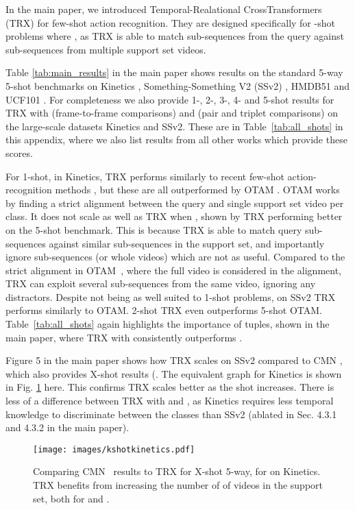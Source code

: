 \documentclass[final]{cvpr}
\begin{document}
In the main paper, we introduced Temporal-Realational CrossTransformers (TRX) for few-shot action recognition.  They are designed specifically for -shot problems where , as TRX is able to match sub-sequences from the query against sub-sequences from multiple support set videos.

Table \ref{tab:main_results} in the main paper shows results on the standard 5-way 5-shot benchmarks on Kinetics \cite{Carreira}, Something-Something V2 (SSv2) \cite{Goyal2017}, HMDB51 \cite{Kuehnea} and UCF101 \cite{Soomro2012}.
For completeness we also provide 1-, 2-, 3-, 4- and 5-shot results for TRX with  (\ie frame-to-frame comparisons) and  (\ie pair and triplet comparisons) on the large-scale datasets Kinetics and SSv2.  These are in Table~\ref{tab:all_shots} in this appendix, where we also list results from all other works which provide these scores.


For 1-shot, in Kinetics, TRX performs similarly to recent few-shot action-recognition methods \cite{Zhu2018,Bishay2019,Zhang2020}, but these are all outperformed by OTAM \cite{Cao2020}.  OTAM works by finding a strict alignment between the query and single support set video per class.  It does not scale as well as TRX when , shown by TRX performing better on the 5-shot benchmark.
This is because TRX is able to match query sub-sequences against similar sub-sequences in the support set, and importantly ignore sub-sequences (or whole videos) which are not as useful.  
Compared to the strict alignment in OTAM~\cite{Cao2020}, where the full video is considered in the alignment, TRX can exploit several sub-sequences from the same video, ignoring any distractors.  Despite not being as well suited to 1-shot problems, on SSv2 TRX performs similarly to OTAM.  2-shot TRX even outperforms 5-shot OTAM.
Table~\ref{tab:all_shots} again highlights the importance of tuples, shown in the main paper, where TRX with  consistently outperforms .


Figure 5 in the main paper shows how TRX scales on SSv2 compared to CMN \cite{Zhu2018,Zhu2020}, which also provides X-shot results (.  The equivalent graph for Kinetics is shown in Fig. \ref{fig:kshotkinetics} here. This confirms TRX scales better as the shot increases.  There is less of a difference between TRX with  and , as Kinetics requires less temporal knowledge to discriminate between the classes than SSv2 (ablated in Sec. 4.3.1 and 4.3.2 in the main paper).

\begin{figure}
\centering
\texttt{[image: images/kshotkinetics.pdf]}
\caption{Comparing CMN~\cite{Zhu2020} results to TRX for X-shot 5-way, for  on Kinetics. TRX benefits from increasing the number of of videos in the support set, both for  and .}
\label{fig:kshotkinetics}
\end{figure}
\end{document}
